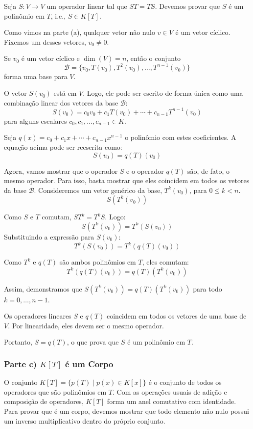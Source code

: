 Seja $S : V \to V$ um operador linear tal que $ST = TS$. Devemos provar que $S$ é um polinômio em $T$, i.e., $S \in K[T]$.

Como vimos na parte (a), qualquer vetor não nulo $v \in V$ é um vetor cíclico. Fixemos um desses vetores, $v_0 \neq 0$.

Se $v_0$ é um vetor cíclico e $\dim(V) = n$, então o conjunto
\[
\mathcal{B} = \{ v_0, T(v_0), T^2(v_0), \ldots, T^{n-1}(v_0) \}
\]
forma uma base para $V$.

O vetor $S(v_0)$ está em $V$. Logo, ele pode ser escrito de forma única como uma combinação linear dos vetores da base $\mathcal{B}$:
\[
S(v_0) = c_0 v_0 + c_1 T(v_0) + \cdots + c_{n-1}T^{n-1}(v_0)
\]
para alguns escalares $c_0, c_1, \ldots, c_{n-1} \in K$.

Seja $q(x) = c_0 + c_1x + \cdots + c_{n-1}x^{n-1}$ o polinômio com estes coeficientes. A equação acima pode ser reescrita como:
\[
S(v_0) = q(T)(v_0)
\]

Agora, vamos mostrar que o operador $S$ e o operador $q(T)$ são, de fato, o mesmo operador. Para isso, basta mostrar que eles coincidem em todos os vetores da base $\mathcal{B}$. Consideremos um vetor genérico da base, $T^k(v_0)$, para $0 \leq k < n$.
\[
S(T^k(v_0))
\]

Como $S$ e $T$ comutam, $ST^k = T^k S$. Logo:
\[
S(T^k(v_0)) = T^k(S(v_0))
\]
Substituindo a expressão para $S(v_0)$:
\[
T^k(S(v_0)) = T^k(q(T)(v_0))
\]

Como $T^k$ e $q(T)$ são ambos polinômios em $T$, eles comutam:
\[
T^k(q(T)(v_0)) = q(T)(T^k(v_0))
\]

Assim, demonstramos que $S(T^k(v_0)) = q(T)(T^k(v_0))$ para todo $k = 0, \ldots, n-1$.

Os operadores lineares $S$ e $q(T)$ coincidem em todos os vetores de uma base de $V$. Por linearidade, eles devem ser o mesmo operador.

Portanto, $S = q(T)$, o que prova que $S$ é um polinômio em $T$.

\subsubsection*{Parte c) $K[T]$ é um Corpo}

O conjunto $K[T] = \{p(T) \mid p(x) \in K[x]\}$ é o conjunto de todos os operadores que são polinômios em $T$. Com as operações usuais de adição e composição de operadores, $K[T]$ forma um anel comutativo com identidade. Para provar que é um corpo, devemos mostrar que todo elemento não nulo possui um inverso multiplicativo dentro do próprio conjunto.

